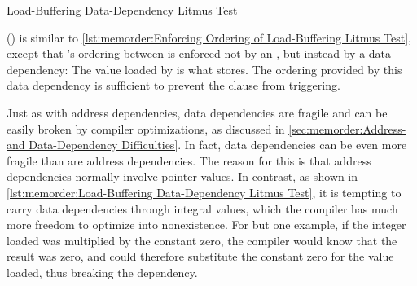 \begin{listing}

\caption{Load-Buffering Data-Dependency Litmus Test}
\label{lst:memorder:Load-Buffering Data-Dependency Litmus Test}
\end{listing}

\begin{fcvref}
()
is similar to
\cref{lst:memorder:Enforcing Ordering of Load-Buffering Litmus Test},
except that 's ordering between  is
enforced not by an , but instead by a data dependency:
The value loaded by  is what  stores.
The ordering provided by this data dependency is sufficient to prevent
the  clause from triggering.
\end{fcvref}

Just as with address dependencies, data dependencies are
fragile and can be easily broken by compiler optimizations, as discussed in
\cref{sec:memorder:Address- and Data-Dependency Difficulties}.
In fact, data dependencies can be even more fragile than are address
dependencies.
The reason for this is that address dependencies normally involve
pointer values.
In contrast, as shown in
\cref{lst:memorder:Load-Buffering Data-Dependency Litmus Test},
it is tempting to carry data dependencies through integral values,
which the compiler has much more freedom to optimize into nonexistence.
For but one example, if the integer loaded was multiplied by the constant
zero, the compiler would know that the result was zero, and could therefore
substitute the constant zero for the value loaded, thus breaking
the dependency.

\QuickQuizEnd

